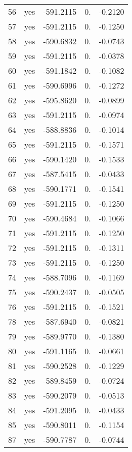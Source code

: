 \begin{table}[h]
\begin{tabular}{ccccc}
        56 & yes &  -591.2115 & 0. &  -0.2120 \\
        57 & yes &  -591.2115 & 0. &  -0.1250 \\
        58 & yes &  -590.6832 & 0. &  -0.0743 \\
        59 & yes &  -591.2115 & 0. &  -0.0378 \\
        60 & yes &  -591.1842 & 0. &  -0.1082 \\
        61 & yes &  -590.6996 & 0. &  -0.1272 \\
        62 & yes &  -595.8620 & 0. &  -0.0899  \\
        63 & yes &  -591.2115 & 0. &  -0.0974 \\
        64 & yes &  -588.8836 & 0. &  -0.1014 \\
        65 & yes &  -591.2115 & 0. &  -0.1571 \\
        66 & yes &  -590.1420 & 0. &  -0.1533 \\
        67 & yes &  -587.5415 & 0. &  -0.0433 \\
        68 & yes &  -590.1771 & 0. &  -0.1541 \\
        69 & yes &  -591.2115 & 0. &  -0.1250 \\
        70 & yes &  -590.4684 & 0. &  -0.1066 \\
        71 & yes &  -591.2115 & 0. &  -0.1250 \\
        72 & yes &  -591.2115 & 0. &  -0.1311 \\
        73 & yes &  -591.2115 & 0. &  -0.1250 \\
        74 & yes &  -588.7096 & 0. &  -0.1169 \\
        75 & yes &  -590.2437 & 0. &  -0.0505 \\
        76 & yes &  -591.2115 & 0. &  -0.1521 \\
        78 & yes &  -587.6940 & 0. &  -0.0821 \\
        79 & yes &  -589.9770 & 0. &  -0.1380 \\
        80 & yes &  -591.1165 & 0. &  -0.0661 \\
        81 & yes &  -590.2528 & 0. &  -0.1229 \\
        82 & yes &  -589.8459 & 0. &  -0.0724 \\
        83 & yes &  -590.2079 & 0. &  -0.0513 \\
        84 & yes &  -591.2095 & 0. &  -0.0433 \\
        85 & yes &  -590.8011 & 0. &  -0.1154 \\
        87 & yes &  -590.7787 & 0. &  -0.0744 \\

\end{tabular}
\end{table}
